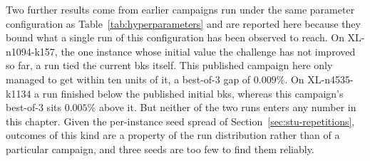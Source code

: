 \begin{table}[H]
  \centering
  \caption{\gls{drispi}'s Best-of-3 Cost Matching or Beating a Published Reference.}
  \label{tab:matches-beats}
  \end{table}
\vspace{-6pt}

Two further results come from earlier campaigns run under the same parameter
configuration as Table~\ref{tab:hyperparameters} and are reported here because
they bound what a single run of this configuration has been observed to reach.
On XL-n1094-k157, the one instance whose initial value the challenge has not
improved so far, a run tied the current \gls{bks} itself. This published
campaign here only managed to get within ten units of it, a best-of-3 gap of
$0.009\%$. On XL-n4535-k1134 a run finished below the published initial \gls{bks}, whereas this campaign's best-of-3 sits $0.005\%$ above it. But neither of the two runs enters any number in this chapter. Given the per-instance
seed spread of Section~\ref{sec:stu-repetitions}, outcomes of this kind are
a property of the run distribution rather than of a particular campaign, and three seeds are too few to find them reliably.

